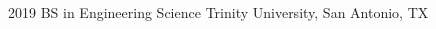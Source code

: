 \documentclass[9pt]{developercv} %
\begin{document}
\vspace{0.5cm}



\begin{minipage}[t]{0.4\textwidth} %
	\vspace{-\baselineskip} %
	
	\lorem \lorem \lorem \lorem \lorem\\ %
\end{minipage}
\hfill %
\begin{minipage}[t]{0.5\textwidth} %
	\vspace{-\baselineskip} %
	\begin{barchart}{5.5}
	\end{barchart}
\end{minipage}

\begin{center}
\end{center}



\begin{entrylist}
	\entry
		{2019}
		{BS in Engineering Science}
		{Trinity University, San Antonio, TX }
		{\lorem\lorem\lorem}
\end{entrylist}



\end{document}
